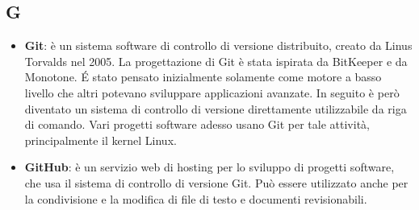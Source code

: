\subsection{G}
\begin{itemize}
	\item
	\textbf{Git}: è un sistema software di controllo di versione distribuito, creato da Linus Torvalds nel 2005.
	La progettazione di Git è stata ispirata da BitKeeper e da Monotone. \'E stato pensato inizialmente solamente come motore a basso livello che altri potevano sviluppare applicazioni avanzate. In seguito è però diventato un sistema di controllo di versione direttamente utilizzabile da riga di comando. Vari progetti software adesso usano Git per tale attività, principalmente il kernel Linux.
	\item
	\textbf{GitHub}: è un servizio web di hosting per lo sviluppo di progetti software, che usa il sistema di controllo di versione Git. Può essere utilizzato anche per la condivisione e la modifica di file di testo e documenti revisionabili. 
\end{itemize}